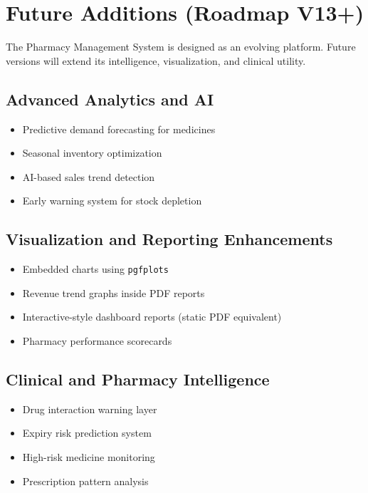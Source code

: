 \documentclass[12pt,a4paper]{article}
\begin{document}
\section{Future Additions (Roadmap V13+)}

\begin{tcolorbox}[
colback=lightblue,
colframe=mainblue,
title=System Evolution Roadmap,
arc=3mm,
boxrule=0.8pt]

The Pharmacy Management System is designed as an evolving platform.
Future versions will extend its intelligence, visualization, and clinical utility.

\end{tcolorbox}

\subsection{Advanced Analytics and AI}

\begin{itemize}
\item Predictive demand forecasting for medicines
\item Seasonal inventory optimization
\item AI-based sales trend detection
\item Early warning system for stock depletion
\end{itemize}

\subsection{Visualization and Reporting Enhancements}

\begin{itemize}
\item Embedded charts using \texttt{pgfplots}
\item Revenue trend graphs inside PDF reports
\item Interactive-style dashboard reports (static PDF equivalent)
\item Pharmacy performance scorecards
\end{itemize}

\subsection{Clinical and Pharmacy Intelligence}

\begin{itemize}
\item Drug interaction warning layer
\item Expiry risk prediction system
\item High-risk medicine monitoring
\item Prescription pattern analysis
\end{itemize}
\end{document}
